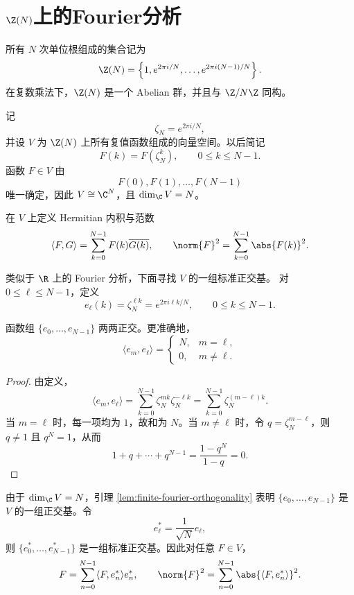 \section{$\Z(N)$上的Fourier分析}

\begin{definition}\label{def:finite-cyclic-group-ZN}
	所有 $N$ 次单位根组成的集合记为
	\[
	\Z(N)
	=\left\{1,e^{2\pi i/N},\ldots,e^{2\pi i(N-1)/N}\right\}.
	\]
	在复数乘法下，$\Z(N)$ 是一个 Abelian 群，并且与
	$\Z/N\Z$ 同构。
\end{definition}

记
\[
\zeta_N=e^{2\pi i/N},
\]
并设 $V$ 为 $\Z(N)$ 上所有复值函数组成的向量空间。以后简记
\[
F(k)=F(\zeta_N^k),
\qquad 0\leq k\leq N-1.
\]
函数 $F\in V$ 由
\[
F(0),F(1),\ldots,F(N-1)
\]
唯一确定，因此 $V\cong\C^N$，且 $\dim_\C V=N$。

在 $V$ 上定义 Hermitian 内积与范数
\[
\langle F,G\rangle
=\sum_{k=0}^{N-1}F(k)\overline{G(k)},
\qquad
\norm{F}^2=\sum_{k=0}^{N-1}\abs{F(k)}^2.
\]

类似于 $\R$ 上的 Fourier 分析，下面寻找 $V$ 的一组标准正交基。
对 $0\leq\ell\leq N-1$，定义
\[
e_\ell(k)=\zeta_N^{\ell k}
=e^{2\pi i\ell k/N},
\qquad 0\leq k\leq N-1.
\]

\begin{lemma}\label{lem:finite-fourier-orthogonality}
	函数组 $\{e_0,\ldots,e_{N-1}\}$ 两两正交。更准确地，
	\[
	\langle e_m,e_\ell\rangle
	=\begin{cases}
	N,&m=\ell,\\
	0,&m\neq\ell.
	\end{cases}
	\]
\end{lemma}

\begin{proof}
	由定义，
	\[
	\langle e_m,e_\ell\rangle
	=\sum_{k=0}^{N-1}\zeta_N^{mk}\zeta_N^{-\ell k}
	=\sum_{k=0}^{N-1}\zeta_N^{(m-\ell)k}.
	\]
	当 $m=\ell$ 时，每一项均为 $1$，故和为 $N$。当
	$m\neq\ell$ 时，令 $q=\zeta_N^{m-\ell}$，则 $q\neq1$ 且
	$q^N=1$，从而
	\[
	1+q+\cdots+q^{N-1}=\frac{1-q^N}{1-q}=0.
	\]
\end{proof}

由于 $\dim_\C V=N$，引理 \ref{lem:finite-fourier-orthogonality}
表明 $\{e_0,\ldots,e_{N-1}\}$ 是 $V$ 的一组正交基。令
\[
e_\ell^*=\frac1{\sqrt N}e_\ell,
\]
则 $\{e_0^*,\ldots,e_{N-1}^*\}$ 是一组标准正交基。因此对任意
$F\in V$，
\[
F=\sum_{n=0}^{N-1}\langle F,e_n^*\rangle e_n^*,
\qquad
\norm{F}^2
=\sum_{n=0}^{N-1}\abs{\langle F,e_n^*\rangle}^2.
\]


